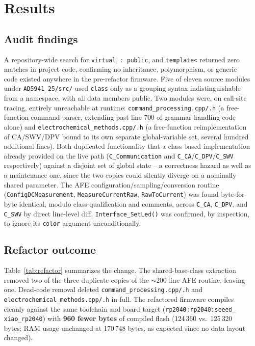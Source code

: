 \section{Results}
\label{sec:results}

\subsection{Audit findings}
A repository-wide search for \texttt{virtual}, \texttt{: public}, and
\texttt{template<} returned zero matches in project code, confirming no
inheritance, polymorphism, or generic code existed anywhere in the
pre-refactor firmware. Five of eleven source modules under
\texttt{AD5941\_25/src/} used \texttt{class} only as a grouping syntax
indistinguishable from a namespace, with all data members public. Two
modules were, on call-site tracing, entirely unreachable at runtime:
\texttt{command\_processing.cpp/.h} (a free-function command parser,
extending past line 700 of grammar-handling code alone) and
\texttt{electrochemical\_methods.cpp/.h} (a free-function reimplementation
of CA/SWV/DPV bound to its own separate global-variable set, several hundred
additional lines). Both duplicated functionality that a class-based
implementation already provided on the live path
(\texttt{C\_Communication} and \texttt{C\_CA}/\texttt{C\_DPV}/\texttt{C\_SWV}
respectively) against a disjoint set of global state -- a correctness hazard
as well as a maintenance one, since the two copies could silently diverge on
a nominally shared parameter. The AFE configuration/sampling/conversion
routine (\texttt{ConfigDCMeasurement}, \texttt{MeasureCurrentRaw},
\texttt{RawToCurrent}) was found byte-for-byte identical, modulo
class-qualification and comments, across \texttt{C\_CA}, \texttt{C\_DPV},
and \texttt{C\_SWV} by direct line-level diff. \texttt{Interface\_SetLed()}
was confirmed, by inspection, to ignore its \texttt{color} argument
unconditionally.

\subsection{Refactor outcome}
Table~\ref{tab:refactor} summarizes the change. The shared-base-class
extraction removed two of the three duplicate copies of the
$\sim$200-line AFE routine, leaving one. Dead-code removal deleted
\texttt{command\_processing.cpp/.h} and
\texttt{electrochemical\_methods.cpp/.h} in full. The refactored firmware
compiles cleanly against the same toolchain and board target
(\texttt{rp2040:\allowbreak rp2040:\allowbreak seeed\_\allowbreak
xiao\_\allowbreak rp2040}) with \textbf{960 fewer bytes}
of compiled flash (124\,360 vs.\ 125\,320 bytes; RAM usage unchanged at
170\,748 bytes, as expected since no data layout changed).

